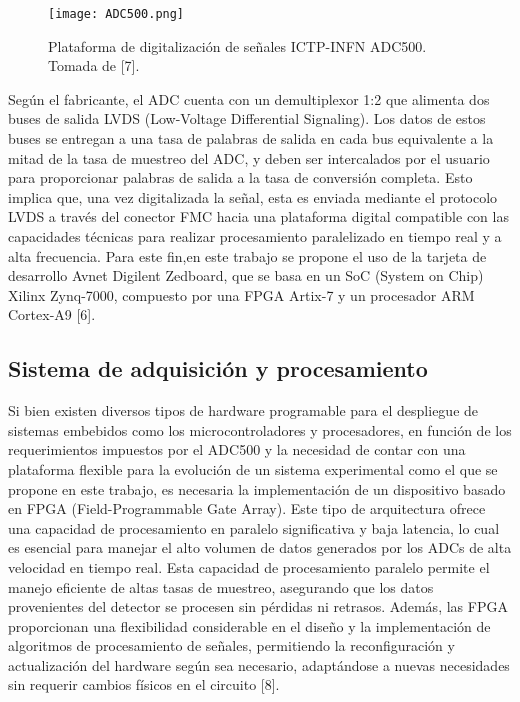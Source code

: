 \documentclass[]{book}
\begin{document}
\begin{figure}[h]
    \centering
    \texttt{[image: ADC500.png]}
    \caption{Plataforma de digitalización de señales ICTP-INFN ADC500. Tomada de [7].}
    \label{fig:adc500}

\end{figure}

\noindent Según el fabricante, el ADC cuenta con un demultiplexor 1:2 que alimenta dos buses de salida LVDS (Low-Voltage Differential Signaling). Los datos de estos buses se entregan a una tasa de palabras de salida en cada bus equivalente a la mitad de la tasa de muestreo del ADC, y deben ser intercalados por el usuario para proporcionar palabras de salida a la tasa de conversión completa. Esto implica que, una vez digitalizada la señal, esta es enviada mediante el protocolo LVDS a través del conector FMC hacia una plataforma digital compatible con las capacidades técnicas para realizar procesamiento paralelizado en tiempo real y a alta frecuencia. Para este fin,en este trabajo se propone el uso de la tarjeta de desarrollo Avnet Digilent Zedboard, que se basa en un SoC (System on Chip) Xilinx Zynq-7000, compuesto por una FPGA Artix-7 y un procesador ARM Cortex-A9 [6].


\subsection*{Sistema de adquisición y procesamiento}

\noindent Si bien existen diversos tipos de hardware programable para el despliegue de sistemas embebidos como los microcontroladores y procesadores, en función de los requerimientos impuestos por el ADC500 y la necesidad de contar con una plataforma flexible para la evolución de un sistema experimental como el que se propone en este trabajo, es necesaria la implementación de un dispositivo basado en FPGA (Field-Programmable Gate Array). Este tipo de arquitectura ofrece una capacidad de procesamiento en paralelo significativa y baja latencia, lo cual es esencial para manejar el alto volumen de datos generados por los ADCs de alta velocidad en tiempo real. Esta capacidad de procesamiento paralelo permite el manejo eficiente de altas tasas de muestreo, asegurando que los datos provenientes del detector se procesen sin pérdidas ni retrasos. Además, las FPGA proporcionan una flexibilidad considerable en el diseño y la implementación de algoritmos de procesamiento de señales, permitiendo la reconfiguración y actualización del hardware según sea necesario, adaptándose a nuevas necesidades sin requerir cambios físicos en el circuito [8].\\
\end{document}
